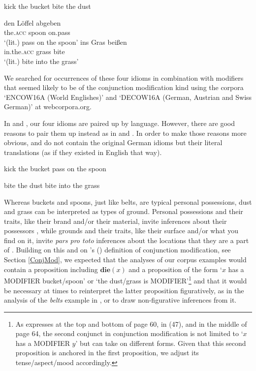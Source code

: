 \documentclass[output=paper]{langsci/langscibook}
\begin{document}
\ea \label{ktb+btd}
\ea
kick the bucket
\ex
bite the dust
\z
\z

\ea \label{dLa+iGb}
\ea
\gll	den Löffel abgeben \\
	the.\textsc{acc} spoon on.pass \\
\glt	`(lit.) pass on the spoon'
\vspace{5pt}
\ex 
\gll 	ins Gras beißen \\
	in.the.\textsc{acc} grass bite \\
\glt	`(lit.) bite into the grass'
\z
\z

\noindent We searched for occurrences of these four idioms in combination with modifiers that seemed likely to be of the conjunction modification kind using the corpora `\mbox{ENCOW16A} (World Englishes)' and `\mbox{DECOW16A} (German, Austrian and Swiss German)' at webcorpora.org.

In  and , our four idioms are paired up by language. However, there are good reasons to pair them up instead as in  and . In order to make those reasons more obvious,  and  do not contain the original German idioms but their literal 
translations (as if they existed in English that way).

\ea \label{ktb+pots}
\ea
kick the bucket
\ex
pass on the spoon
\z
\z

\ea \label{btd+bits}
\ea
bite the dust
\ex
bite into the grass
\z
\z

\noindent Whereas buckets and spoons, just like belts, are typical personal possessions, dust and grass can be interpreted as types of ground. Personal possessions and their traits, like their brand and/or their material, invite inferences about their possessors \citep[see, e.g.\@,][]{Belk88}, while grounds and their traits, like their surface and/or what you find on it, invite \textit{pars pro toto} inferences about the locations that they are a part of \citep[for a somewhat similar reasoning based on conceptual contiguity, see][92]{stathi07}. Building on this and on \citeauthor{ernst81}'s (\citeyear{ernst81}) definition of conjunction modification, see Section \ref{ConjMod}, we expected that the analyses of our corpus examples would contain a proposition including $\textbf{die}(x)$ and a proposition of the form `$x$ has a MODIFIER bucket/spoon' or `the dust/grass is MODIFIER'\footnote{As \cite{ernst81} expresses at the top and bottom of page 60, in (47), and in the middle of page 64, the second conjunct in conjunction modification is not limited to `$x$ has a MODIFIER $y$' but can take on different forms. Given that this second proposition is anchored in the first proposition, we adjust its tense/aspect/mood accordingly.} and that it would be necessary at times to reinterpret the latter proposition figuratively, as in the analysis of the \underline{} \textit{belts} example in , or to draw non-figurative inferences from it.
\end{document}
